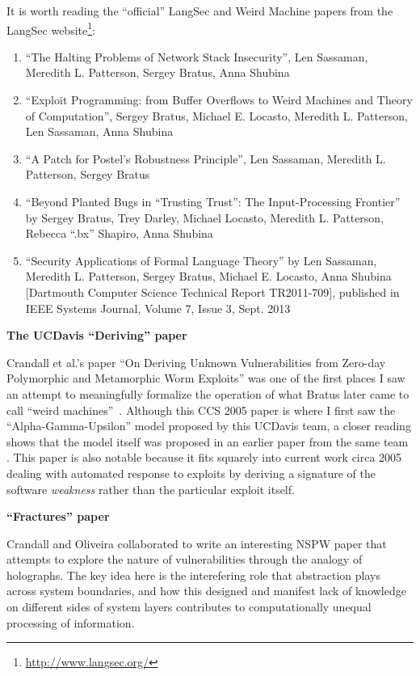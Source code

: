 \documentclass[acmcompsurv,acmnow]{acmtrans2m}
\begin{document}
It is worth reading the ``official'' LangSec and Weird Machine papers
from the LangSec website\footnote{\url{http://www.langsec.org/}}:

\begin{enumerate}
 \item ``The Halting Problems of Network Stack Insecurity'', Len Sassaman, Meredith L. Patterson, Sergey Bratus, Anna Shubina
 \item ``Exploit Programming: from Buffer Overflows to Weird Machines and Theory of Computation'', Sergey Bratus, Michael E. Locasto, Meredith L. Patterson, Len Sassaman, Anna Shubina
 \item ``A Patch for Postel's Robustness Principle'', Len Sassaman, Meredith L. Patterson, Sergey Bratus
 \item ``Beyond Planted Bugs in ``Trusting Trust'': The Input-Processing Frontier'' by Sergey Bratus, Trey Darley, Michael Locasto, Meredith L. Patterson, Rebecca ``.bx'' Shapiro, Anna Shubina
 \item ``Security Applications of Formal Language Theory'' by Len Sassaman, Meredith L. Patterson, Sergey Bratus, Michael E. Locasto, Anna Shubina [Dartmouth Computer Science Technical Report TR2011-709], published in IEEE Systems Journal, Volume 7, Issue 3, Sept. 2013
\end{enumerate}

{\bf The UCDavis ``Deriving'' paper}\cite{Crandall:2005:DUV:1102120.1102152}

Crandall et al.'s paper ``On Deriving Unknown Vulnerabilities from
Zero-day Polymorphic and Metamorphic Worm Exploits'' was one of the
first places I saw an attempt to meaningfully formalize the operation
of what Bratus later came to call ``weird machines''~\cite{XXX}.
Although this CCS 2005 paper is where I first saw the
``Alpha-Gamma-Upsilon'' model proposed by this UCDavis team, a closer
reading shows that the model itself was proposed in an earlier paper
from the same team \cite{XXX}.  This paper is also notable because it
fits squarely into current work circa 2005 dealing with automated
response to exploits by deriving a signature of the software {\em
  weakness} rather than the particular exploit itself.

{\bf ``Fractures'' paper}\cite{Crandall:2012:HVS:2413296.2413309}

Crandall and Oliveira collaborated to write an interesting NSPW paper
that attempts to explore the nature of vulnerabilities through the
analogy of holographs.  The key idea here is the interefering role
that abstraction plays across system boundaries, and how this designed
and manifest lack of knowledge on different sides of system layers
contributes to computationally unequal processing of information.
\end{document}
